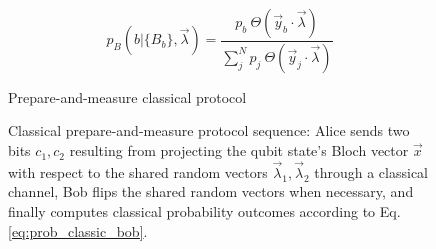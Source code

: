 \begin{equation}\label{eq:prob_classic_bob}
p_B(b|\{B_b\},\vec{\lambda}) = \frac{p_b\ \Theta(\vec{y}_b \cdot \vec{\lambda})}{\sum_{j}^{N}p_j\ \Theta(\vec{y}_j \cdot \vec{\lambda})}
\end{equation}

\begin{figure}[tb]
\begin{center}
\begin{msc}[msc keyword=, instance width=3.6cm]{Prepare-and-measure classical protocol}
\nextlevel[3]
\nextlevel[3]
\nextlevel[1]
\nextlevel[3]
\nextlevel[2]
\end{msc}
\end{center}
\caption{Classical prepare-and-measure protocol sequence: Alice sends two bits $c_1, c_2$ resulting from projecting the qubit state's Bloch vector $\vec{x}$ with respect to the shared random vectors $\vec{\lambda}_1, \vec{\lambda}_2$ through a classical channel, Bob flips the shared random vectors when necessary, and finally computes classical probability outcomes according to Eq. \ref{eq:prob_classic_bob}.}
\label{fig:msc_pm}
\end{figure}



